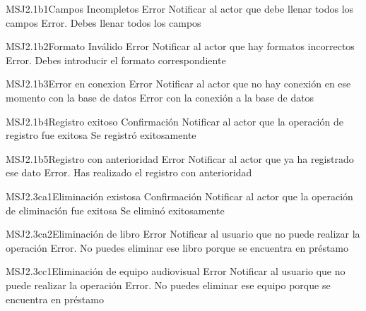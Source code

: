 

\begin{Message}{MSJ2.1b1}{Campos Incompletos}
		\MSGitem[Tipo:] Error	
		\MSGitem[Objetivo: ] Notificar al actor que debe llenar todos los campos
		\MSGitem[Redacción: ] Error. Debes llenar todos los campos
	\end{Message}
	
	\begin{Message}{MSJ2.1b2}{Formato Inválido}
		\MSGitem[Tipo:] Error	
		\MSGitem[Objetivo: ] Notificar al actor que hay formatos incorrectos
		\MSGitem[Redacción: ] Error. Debes introducir el formato correspondiente
	\end{Message}
	
	\begin{Message}{MSJ2.1b3}{Error en conexion}
		\MSGitem[Tipo:] Error	
		\MSGitem[Objetivo: ] Notificar al actor que no hay conexión en ese momento con la base de datos
		\MSGitem[Redacción: ] Error con la conexión a la base de datos
	\end{Message}
	
	\begin{Message}{MSJ2.1b4}{Registro exitoso}
		\MSGitem[Tipo:] Confirmación	
		\MSGitem[Objetivo: ] Notificar al actor que la operación de registro fue exitosa
		\MSGitem[Redacción: ] Se registró exitosamente
	\end{Message}
	
	\begin{Message}{MSJ2.1b5}{Registro con anterioridad}
		\MSGitem[Tipo:] Error	
		\MSGitem[Objetivo: ] Notificar al actor que ya ha registrado ese dato
		\MSGitem[Redacción: ] Error. Has realizado el registro con anterioridad
	\end{Message}
	
	\begin{Message}{MSJ2.3ca1}{Eliminación existosa}
		\MSGitem[Tipo:] Confirmación	
		\MSGitem[Objetivo: ] Notificar al actor que la operación de eliminación fue exitosa
		\MSGitem[Redacción: ] Se eliminó exitosamente
	\end{Message}
	
	\begin{Message}{MSJ2.3ca2}{Eliminación de libro}
		\MSGitem[Tipo:] Error	
		\MSGitem[Objetivo: ] Notificar al usuario que no puede realizar la operación
		\MSGitem[Redacción: ] Error. No puedes eliminar ese libro porque se encuentra en préstamo
	\end{Message}
	
	\begin{Message}{MSJ2.3cc1}{Eliminación de equipo audiovisual}
		\MSGitem[Tipo:] Error	
		\MSGitem[Objetivo: ] Notificar al usuario que no puede realizar la operación
		\MSGitem[Redacción: ] Error. No puedes eliminar ese equipo porque se encuentra en préstamo
	\end{Message}
	
